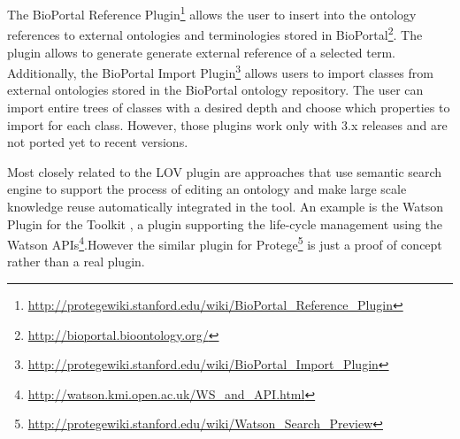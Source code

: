 The BioPortal Reference Plugin\footnote{\url{http://protegewiki.stanford.edu/wiki/BioPortal_Reference_Plugin}} allows the user to insert into the ontology references to external ontologies and terminologies stored in BioPortal\footnote{\url{http://bioportal.bioontology.org/}}. The plugin allows to generate generate external reference of a selected term. Additionally, the BioPortal Import Plugin\footnote{\url{http://protegewiki.stanford.edu/wiki/BioPortal_Import_Plugin}} allows users to import classes from external ontologies stored in the BioPortal ontology repository. The user can import entire trees of classes with a desired depth and choose which properties to import for each class. However, those plugins work only with \protege 3.x releases and are not ported yet to recent versions. 

Most closely related to the {\protege}LOV plugin are approaches that use semantic search engine to support the process of editing an ontology and make large scale knowledge reuse automatically integrated in the tool. An example is the Watson Plugin  \cite{neonguide2008} for the \neon Toolkit \cite{haase2008neon}, a plugin supporting the \neon life-cycle management using the Watson \cite{d2007watson} APIs\footnote{\url{http://watson.kmi.open.ac.uk/WS_and_API.html}}.However the similar plugin for Protege\footnote{\url{http://protegewiki.stanford.edu/wiki/Watson_Search_Preview}} is just a proof of concept rather than a real plugin.

 
